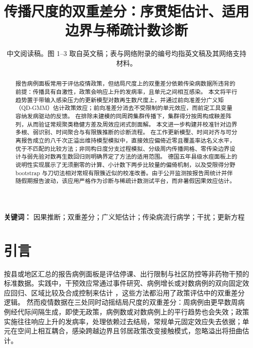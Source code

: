 \documentclass[11pt,a4paper]{ctexart}
\title{传播尺度的双重差分：序贯矩估计、适用边界与稀疏计数诊断}
\author{}
\date{中文阅读稿。图 1--3 取自英文稿；表与网络附录的编号均指英文稿及其网络支持材料。}
\theoremstyle{definition}
\begin{document}
\maketitle

\begin{abstract}
\noindent
报告病例面板常用于评估疫情政策，但结局尺度上的双重差分依赖传染病数据所违背的前提：传播具有自激性，政策会响应上升的发病率，且单元之间相互感染。
本文将平行趋势置于带输入感染压力的更新模型对数再生数尺度上，并通过前向准差分广义矩（QD-GMM）估计政策效应；前向准差分消去不受限制的单元效应，而前定工具变量容纳发病驱动的反馈。
在排除未建模的同周跨集群传播下，集群得分按周构成鞅差阵列，从而验证常规聚类稳健方差及周效应闭式剖面解。
本文进一步构建并校准针对边界多根、弱识别、时间聚合与有限簇推断的诊断流程。
在工作更新模型、时间对齐与可分离报告成立的八千次正溢出维持模型模拟中，直接效应偏倚近零且覆盖率达名义水平，优于不匹配的比较方法；非同构日度分支过程模拟、分级周内传播网格、零传染边界设计与弱先验对数再生数回归则明确界定了方法的适用范围。
德国五年县级水痘面板上的说明性实现展示了无须删零的计算、小计数下两步比较量的偏倚机制，以及受限得分野 bootstrap 与刀切法相对常规有限簇近似的校准改善。由于公开监测按报告周统计并伴随假期报告波动，该应用严格作为诊断与稀疏计数测试平台，而非暑假因果效应估计。
\end{abstract}

\noindent\textbf{关键词：} 因果推断；双重差分；广义矩估计；传染病流行病学；干扰；更新方程

\section{引言}
\label{s:intro}

按县或地区汇总的报告病例面板是评估停课、出行限制与社区防控等非药物干预的标准数据。实践中，干预效应常通过事件研究、病例增长或对数病例的双向固定效应回归、区域比较及合成控制来估计
\citep{hsiang2020anticontagion,chernozhukov2021masks,mitze2020masks}，这些方法都沿用了政策评估中的双重差分逻辑\citep{callaway2021did,roth2023trending,haber2021impact}。
然而疫情数据在三处同时动摇结局尺度的双重差分：周病例由更早数周病例经代际间隔生成\citep{wallinga2004different,fraser2007estimating,wallinga2007generation}，即使无政策，病例数或对数病例上的平行趋势也会失效\citep{gauthier2021twfe,feng2024parallel}；政策实施往往响应上升的发病率，处理依赖过去结局，常规单元固定效应失去依据\citep{imai2019fixed,zhang2025timevarying}；单元在空间上相互耦合，感染跨越边界且邻居政策改变接触模式\citep{hudgens2008interference,halloran2016dependent,aronow2017exposure}，忽略溢出将扭曲估计\citep{enriquez2025spillovers}。
\end{document}
